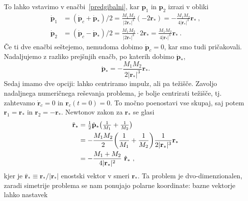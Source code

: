 \documentclass[12pt, a4paper]{article}
\renewcommand{\r}{
    \ensuremath{\mathbf{r}}
}
\newcommand{\p}{
    \ensuremath{\mathbf{p}}
}
\newcommand{\sfrac}[2]{
    \ensuremath{\textstyle{\frac{#1}{#2}}}
}
\begin{document}
To lahko vstavimo v ena\v cbi~\eqref{predgibalni}, kar $\p_1$ in $\p_2$ izrazi v obliki
\begin{align*}
    \dot{\p}_1 &= (\dot{\p}_c + \dot{\p}_*)/2 = \frac{M_1M_2}{|2\r_*|^3}(-2\r_*) = -\frac{M_1M_2}{4|\r_*|^3}\r_*\ , \\
    \dot{\p}_2 &= (\dot{\p}_c - \dot{\p}_*)/2 = \frac{M_1M_2}{|2\r_*|^3}\cdot 2\r_* = \frac{M_1M_2}{4|\r_*|^3}\r_*\ .
\end{align*}
\v Ce ti dve ena\v cbi se\v stejemo, nemudoma dobimo $\dot{\p}_c = 0$, kar smo tudi pri\v cakovali. Nadaljujemo z
razliko prej\v snjih ena\v cb, po katerih dobimo $\dot{\p}_*$,
\begin{equation*}
    \dot{\p}_* = - \frac{M_1M_2}{2|\r_*|^3}\r_*.
\end{equation*}
Sedaj imamo dve opciji: lahko centriramo impulz, ali pa te\v zi\v s\v ce. Zavoljo nadaljnega numeri\v cnega re\v sevanja
problema, je bolje centrirati te\v zi\v s\v ce, tj. zahtevamo $\dot{\r}_c = 0$ in $\r_c (t = 0) = 0$. To mo\v cno
poenostavi vse skupaj, saj potem $\r_1 = \r_*$ in $\r_2 = -\r_*$. Newtonov zakon za $\r_*$ se glasi
\begin{align}
    \ddot{\r}_* &= \sfrac{1}{2}\dot{\p}_*\big(\sfrac{1}{M_1} + \sfrac{1}{M_2}\big) \notag \\
                &= -\frac{M_1 M_2}{2}\bigg(\frac{1}{M_1} + \frac{1}{M_2}\bigg)\frac{1}{2|\r_*|^3}\r_* \notag \\
                &= -\frac{M_1 + M_2}{4|\r_*|^2}\ \hat{\r}_*\ ,
    \label{newton}
\end{align}
kjer je $\hat{\r}_* \equiv \r_*/|\r_*|$ enostski vektor v smeri $\r_*$. Ta problem je dvo-dimenzionalen, zaradi simetrije
problema se nam ponujajo polarne koordinate: bazne vektorje 
lahko nastavek
\end{document}
